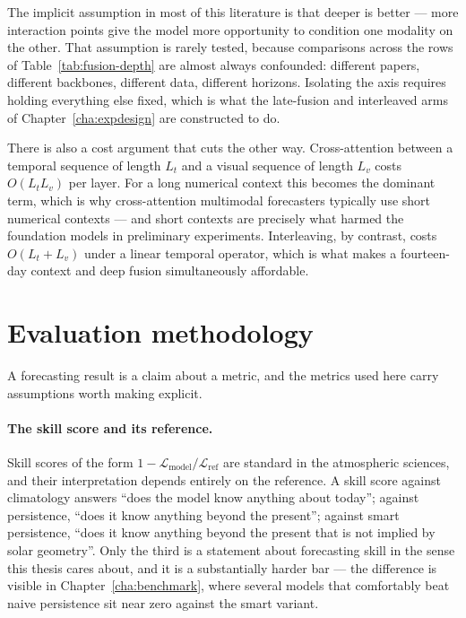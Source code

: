 The implicit assumption in most of this literature is that deeper is better --- more
interaction points give the model more opportunity to condition one modality on the other.
That assumption is rarely tested, because comparisons across the rows of
Table~\ref{tab:fusion-depth} are almost always confounded: different papers, different
backbones, different data, different horizons. Isolating the axis requires holding everything
else fixed, which is what the late-fusion and interleaved arms of
Chapter~\ref{cha:expdesign} are constructed to do.

There is also a cost argument that cuts the other way. Cross-attention between a temporal
sequence of length $L_t$ and a visual sequence of length $L_v$ costs $O(L_t L_v)$ per layer.
For a long numerical context this becomes the dominant term, which is why cross-attention
multimodal forecasters typically use short numerical contexts --- and short contexts are
precisely what harmed the foundation models in preliminary experiments. Interleaving, by
contrast, costs $O(L_t + L_v)$ under a linear temporal operator, which is what makes a
fourteen-day context and deep fusion simultaneously affordable.

\section{Evaluation methodology}
\label{sec:eval-lit}

A forecasting result is a claim about a metric, and the metrics used here carry assumptions
worth making explicit.

\paragraph{The skill score and its reference.} Skill scores of the form
$1 - \mathcal{L}_{\text{model}} / \mathcal{L}_{\text{ref}}$ are standard in the atmospheric
sciences, and their interpretation depends entirely on the reference. A skill score against
climatology answers ``does the model know anything about today''; against persistence, ``does
it know anything beyond the present''; against smart persistence, ``does it know anything
beyond the present that is not implied by solar geometry''. Only the third is a statement
about forecasting skill in the sense this thesis cares about, and it is a substantially
harder bar --- the difference is visible in Chapter~\ref{cha:benchmark}, where several models
that comfortably beat naive persistence sit near zero against the smart variant.


